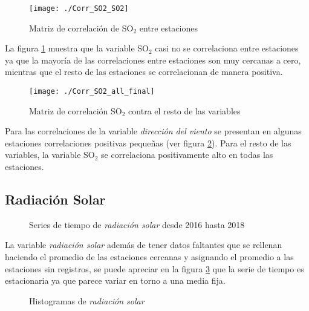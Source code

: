 \begin{figure}[H]
\centering
\texttt{[image: ./Corr\_SO2\_SO2]}
\caption{Matriz de correlación de SO$_{2}$ entre estaciones }
\label{corrSO2_2}
\end{figure}

La figura \ref{corrSO2_2} muestra que la variable SO$_{2}$ casi no se correlaciona entre estaciones ya que la mayoría de las correlaciones entre estaciones son muy cercanas a cero, mientras que el resto de las estaciones se correlacionan de manera positiva.

\begin{figure}[H]
\centering
\texttt{[image: ./Corr\_SO2\_all\_final]}
\caption{Matriz de correlación SO$_{2}$ contra el resto de las variables}
\label{corrSO2}
\end{figure}


Para las correlaciones de la variable {\em dirección del viento} se presentan en algunas estaciones correlaciones positivas pequeñas (ver figura \ref{corrSO2}). Para el resto de las variables, la variable SO$_{2}$ se correlaciona positivamente alto en todas las estaciones.



\subsection{Radiación Solar}
\begin{figure}[H]
\centering
{}
\caption{Series de tiempo de {\em radiación solar} desde 2016 hasta 2018}
\label{seriesolar}
\end{figure}

La variable {\em radiación solar} además de tener datos faltantes que se rellenan haciendo el promedio de las estaciones cercanas y asignando el promedio a las estaciones sin registros, se puede apreciar en la figura \ref{seriesolar} que la serie de tiempo es estacionaria ya que parece variar en torno a una media fija.

\begin{figure}[H]
\centering
{}
\caption{Histogramas de {\em radiación solar}}
\label{histsolar}
\end{figure}

